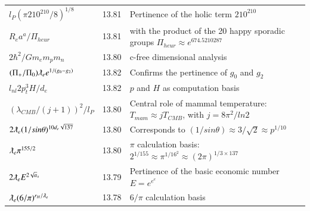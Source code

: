 \documentclass[a4paper,9pt]{article}
\begin{document}
\begin{table}
\begin{tabular}{lll}
  
  
  
  
 
  
  
  $ l_{P} (\pi 210^{210}/8)^{1/8}$  & 13.81    & Pertinence of the holic term $210^{210}$  \\
  
  
  
  
  
  
  
 
 $R_e a^a/\Pi_{heur}$  & 13.81    & with the product of the 20 happy sporadic groups $\Pi_{heur}\approx e^{674.5210287}$  \\
 


$ 2\hbar^2/Gm_em_pm_n $ & 13.80 & c-free dimensional analysis \cite{Sanchez4}  \\
 
 $(\Pi_+/\Pi_0) \lambdabar_{e} e^{1/(g_0-g_2)}$ & 13.82 & Confirms the pertinence of $g_0$ and $g_2$  \\
 
 $l_{nl}2p_t^3H/d_e $ & 13.82 & $p$ and $H$ as computation basis  \\

 $ (\lambda_{CMB}/(j+1))^2/l_P$ & 13.80 & Central role of mammal temperature: $T_{mam}\approx j T_{CMB}$, with $j = 8\pi^2/ln2$ \\
 
  $ 2 \lambdabar_{e} (1/sin\theta)^{10d_e\sqrt {137}} $ & 13.80 & Corresponds to $(1/sin\theta) \approx 3/\sqrt2 \approx p^{1/10}$   \\
  
  $ \lambdabar_{e} \pi^{155/2}$ & 13.80 & $\pi$ calculation basis: $2^{1/155} \approx \pi^{1/16^2}  \approx (2\pi)^{1/3\times 137} $  \\
  
  $ 2\lambdabar_{e} E^{2\sqrt a_s}$ & 13.79 & Pertinence of the basic economic number $E = e^{e^e}$  \\
  
  
  $ \lambdabar_{e} (6/\pi)^{r_H/\lambdabar_e}$ & 13.78 & $6/\pi$ calculation basis   \\  
  
  
  

\end{tabular}
\end{table}
\end{document}
